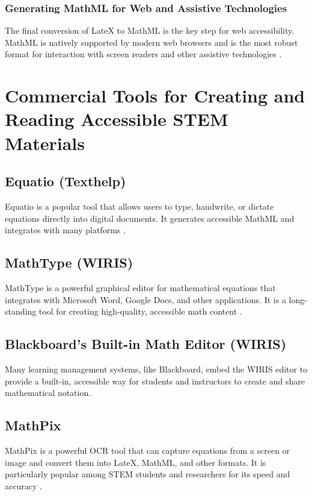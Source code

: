 \subsubsection{Generating MathML for Web and Assistive Technologies}\label{ch11:sssec:marker-mathml}
The final conversion of \gls{LateX} to \gls{MathML} is the key step for web accessibility. \gls{MathML} is natively supported by modern web browsers and is the most robust format for interaction with screen readers and other assistive technologies \supercite{W3CMathMLWeb}.

\section{Commercial Tools for Creating and Reading Accessible STEM Materials}\label{ch11:sec:commercial-tools}
\subsection{Equatio (Texthelp)}\label{ch11:ssec:equatio}
Equatio is a popular tool that allows users to type, handwrite, or dictate equations directly into digital documents. It generates accessible \gls{MathML} and integrates with many platforms \supercite{TexthelpEquatio, EquatioPricing}.

\subsection{MathType (WIRIS)}\label{ch11:ssec:mathtype}
MathType is a powerful graphical editor for mathematical equations that integrates with Microsoft Word, Google Docs, and other applications. It is a long-standing tool for creating high-quality, accessible math content \supercite{WIRISMathType, WIRISMathTypeFeatures}.

\subsection{Blackboard's Built-in Math Editor (WIRIS)}\label{ch11:ssec:blackboard-wiris}
Many learning management systems, like Blackboard, embed the WIRIS editor to provide a built-in, accessible way for students and instructors to create and share mathematical notation.

\subsection{MathPix}\label{ch11:ssec:MathPix}
MathPix is a powerful \gls{OCR} tool that can capture equations from a screen or image and convert them into \gls{LateX}, \gls{MathML}, and other formats. It is particularly popular among STEM students and researchers for its speed and accuracy \supercite{MathPix, MathpixSnip}.

